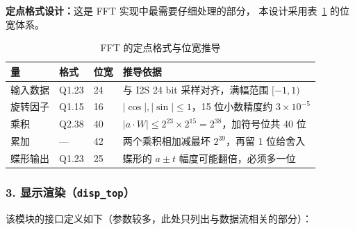 \documentclass[withoutpreface,bwprint]{cumcmthesis}
\begin{document}
\textbf{定点格式设计：}这是 FFT 实现中最需要仔细处理的部分，
本设计采用表~\ref{tab:fftfixed} 的位宽体系。

\begin{table}[H]
\centering
\caption{FFT 的定点格式与位宽推导}
\label{tab:fftfixed}
\begin{tabular}{p{2.2cm}p{1.6cm}p{1.2cm}p{8.0cm}}
\toprule[1.5pt]
\rowcolor{gray!25} 量 & 格式 & 位宽 & 推导依据 \\
\midrule[1pt]
输入数据 & Q1.23 & 24 & 与 I2S 24 bit 采样对齐，满幅范围 $[-1, 1)$ \\
旋转因子 & Q1.15 & 16 & $|\cos|,|\sin| \le 1$，15 位小数精度约 $3\times10^{-5}$ \\
乘积 & Q2.38 & 40 & $|a \cdot W| \le 2^{23} \times 2^{15} = 2^{38}$，加符号位共 40 位 \\
累加 & — & 42 & 两个乘积相加减最坏 $2^{39}$，再留 1 位给舍入 \\
蝶形输出 & Q1.23 & 25 & 蝶形的 $a \pm t$ 幅度可能翻倍，必须多一位 \\
\bottomrule[1.5pt]
\end{tabular}
\end{table}

%

\subsubsection*{3. 显示渲染（\texttt{disp\_top}）}

该模块的接口定义如下（参数较多，此处只列出与数据流相关的部分）：
\end{document}
